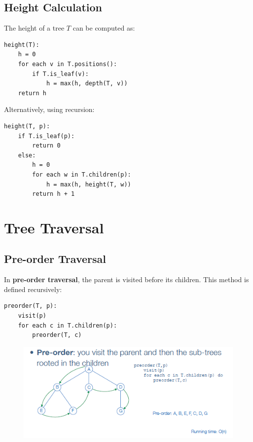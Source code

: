 \subsection{Height Calculation}
The height of a tree \( T \) can be computed as:
\begin{verbatim}
height(T):
    h = 0
    for each v in T.positions():
        if T.is_leaf(v):
            h = max(h, depth(T, v))
    return h
\end{verbatim}

Alternatively, using recursion:
\begin{verbatim}
height(T, p):
    if T.is_leaf(p):
        return 0
    else:
        h = 0
        for each w in T.children(p):
            h = max(h, height(T, w))
        return h + 1
\end{verbatim}

\section{Tree Traversal}
\subsection{Pre-order Traversal}
In \textbf{pre-order traversal}, the parent is visited before its children. This method is defined recursively:
\begin{verbatim}
preorder(T, p):
    visit(p)
    for each c in T.children(p):
        preorder(T, c)
\end{verbatim}
\begin{figure}[h!]
    \centering
    \includegraphics[width=0.75\linewidth]{immagini/tree1.png}
\end{figure}


